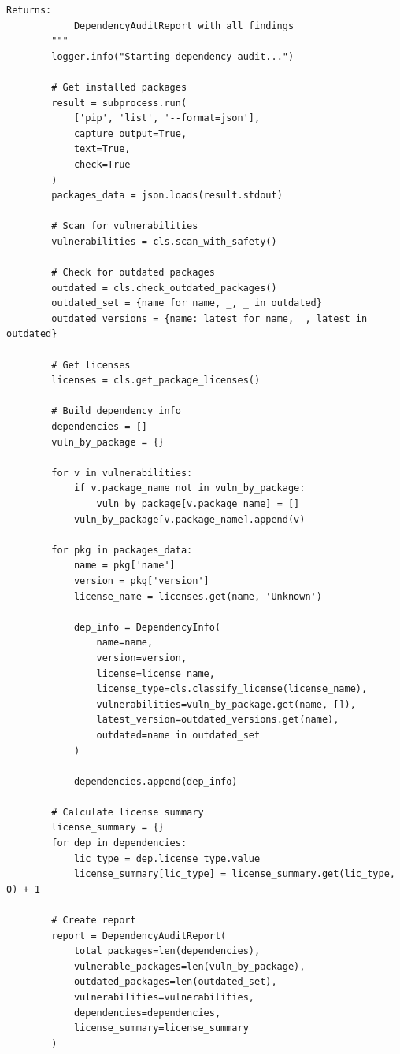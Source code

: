 \begin{lstlisting}[style=python, caption={Dependency auditing and vulnerability scanning}]
        Returns:
            DependencyAuditReport with all findings
        """
        logger.info("Starting dependency audit...")

        # Get installed packages
        result = subprocess.run(
            ['pip', 'list', '--format=json'],
            capture_output=True,
            text=True,
            check=True
        )
        packages_data = json.loads(result.stdout)

        # Scan for vulnerabilities
        vulnerabilities = cls.scan_with_safety()

        # Check for outdated packages
        outdated = cls.check_outdated_packages()
        outdated_set = {name for name, _, _ in outdated}
        outdated_versions = {name: latest for name, _, latest in outdated}

        # Get licenses
        licenses = cls.get_package_licenses()

        # Build dependency info
        dependencies = []
        vuln_by_package = {}

        for v in vulnerabilities:
            if v.package_name not in vuln_by_package:
                vuln_by_package[v.package_name] = []
            vuln_by_package[v.package_name].append(v)

        for pkg in packages_data:
            name = pkg['name']
            version = pkg['version']
            license_name = licenses.get(name, 'Unknown')

            dep_info = DependencyInfo(
                name=name,
                version=version,
                license=license_name,
                license_type=cls.classify_license(license_name),
                vulnerabilities=vuln_by_package.get(name, []),
                latest_version=outdated_versions.get(name),
                outdated=name in outdated_set
            )

            dependencies.append(dep_info)

        # Calculate license summary
        license_summary = {}
        for dep in dependencies:
            lic_type = dep.license_type.value
            license_summary[lic_type] = license_summary.get(lic_type, 0) + 1

        # Create report
        report = DependencyAuditReport(
            total_packages=len(dependencies),
            vulnerable_packages=len(vuln_by_package),
            outdated_packages=len(outdated_set),
            vulnerabilities=vulnerabilities,
            dependencies=dependencies,
            license_summary=license_summary
        )


\end{lstlisting}
